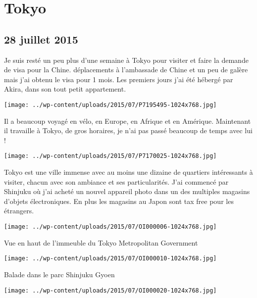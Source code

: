 \chapter{Tokyo}
\section*{28 juillet 2015}
Je suis resté un peu plus d'une semaine à Tokyo pour visiter et faire la demande de visa pour la Chine.  déplacements à l'ambassade de Chine et un peu de galère mais j'ai obtenu le visa pour 1 mois. \newline
 Les premiers jours j'ai été hébergé par Akira, dans son tout petit appartement. \newline
 \newline
\centerline{\texttt{[image: ../wp-content/uploads/2015/07/P7195495-1024x768.jpg]} } 
 \newline
 Il a beaucoup voyagé en vélo, en Europe, en Afrique et en Amérique. Maintenant il travaille à Tokyo, de gros horaires, je n'ai pas passé beaucoup de temps avec lui ! \newline
 \newline
\centerline{\texttt{[image: ../wp-content/uploads/2015/07/P7170025-1024x768.jpg]} } 
 \newline
 Tokyo est une ville immense avec au moins une dizaine de quartiers intéressants à visiter, chacun avec son ambiance et ses particularités. \newline
 J'ai commencé par Shinjuku où j'ai acheté un nouvel appareil photo dans un des multiples magasins d'objets électroniques. En plus les magasins au Japon sont tax free pour les étrangers. \newline
 \newline
\centerline{\texttt{[image: ../wp-content/uploads/2015/07/OI000006-1024x768.jpg]} } 
 \newline
 Vue en haut de l'immeuble du Tokyo Metropolitan Government \newline
 \newline
\centerline{\texttt{[image: ../wp-content/uploads/2015/07/OI000010-1024x768.jpg]} } 
 \newline
 Balade dans le parc Shinjuku Gyoen \newline
 \newline
\centerline{\texttt{[image: ../wp-content/uploads/2015/07/OI000020-1024x768.jpg]} } 
 \newline
